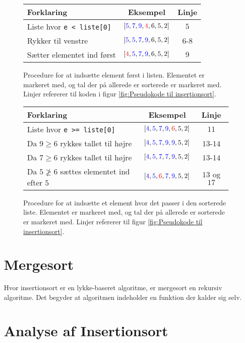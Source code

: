 \begin{figure}
	\begin{center}
		\padtable
		\begin{tabular}{l|c|c}
			Forklaring & Eksempel & Linje \\
			\hline
			Liste hvor \verb|e < liste[0]| & $[\color{blue}5\color{black},\color{blue}7\color{black},\color{blue}9\color{black},\color{red}4\color{black},6,5,2]$ & $5$ \\
			Rykker til venstre & $[\color{blue}5\color{black},\color{blue}5\color{black},\color{blue}7\color{black},\color{blue}9\color{black},6,5,2]$ & $6$-$8$\\
			Sætter elementet ind først  & $[\color{red}4\color{black},\color{blue}5\color{black},\color{blue}7\color{black},\color{blue}9\color{black},6,5,2]$ & $9$
		\end{tabular}
	\end{center}
	\vspace{-3mm}
	\caption{Procedure for at indsætte element først i listen. Elementet er markeret med, og tal der på allerede er sorterede er markeret med. Linjer refererer til koden i figur \ref{fig:Pseudokode til insertionsort}.}
	\label{fig:Indsæt element først i listen}
\end{figure}

\begin{figure}
	\begin{center}
		\padtable
		\begin{tabular}{l|c|c}
			Forklaring & Eksempel & Linje\\
			\hline
			Liste hvor \verb|e >= liste[0]| & $[\color{blue}4\color{black},\color{blue}5\color{black},\color{blue}7\color{black},\color{blue}9\color{black},\color{red}6\color{black},5,2]$ &$11$\\
			Da $9 \geq 6$ rykkes tallet til højre & $[\color{blue}4\color{black},\color{blue}5\color{black},\color{blue}7\color{black},\color{blue}9\color{black},\color{blue}9\color{black},5,2]$ & $13$-$14$\\
			Da $7 \geq 6$ rykkes tallet til højre & $[\color{blue}4\color{black},\color{blue}5\color{black},\color{blue}7\color{black},\color{blue}7\color{black},\color{blue}9\color{black},5,2]$ & $13$-$14$\\
			Da $5 \ngeq 6$ sættes elementet ind efter $5$ & $[\color{blue}4\color{black},\color{blue}5\color{black},\color{red}6\color{black},\color{blue}7\color{black},\color{blue}9\color{black},5,2]$ & $13$ og $17$
		\end{tabular}
	\end{center}
	\vspace{-3mm}
	\caption{Procedure for at indsætte et element hvor det passer i den sorterede liste. Elementet er markeret med, og tal der på allerede er sorterede er markeret med. Linjer refererer til figur \ref{fig:Pseudokode til insertionsort}.}
	\label{fig:Indsæt element hvor det passer i listen}
\end{figure}


\section{Mergesort}
\label{sec:Mergesort}


Hvor insertionsort er en lykke-baseret algoritme, er mergesort en rekursiv algoritme. Det begyder at algoritmen indeholder en funktion der kalder sig selv. 


\section{Analyse af Insertionsort}
\label{sec:Analyse af Insertionsort}


